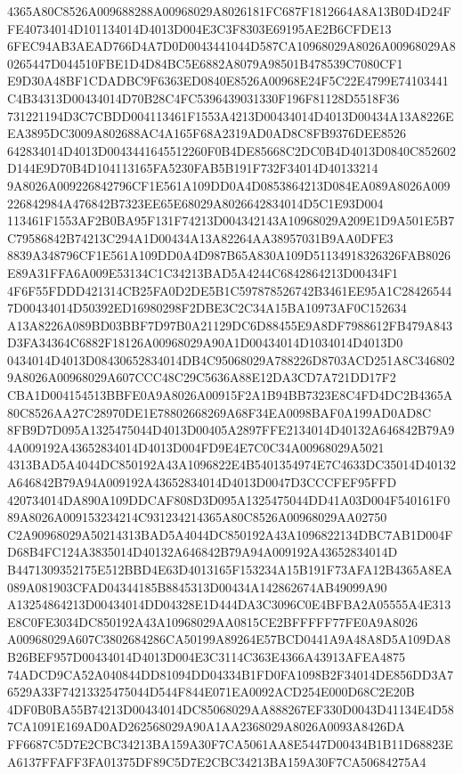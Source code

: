 \documentclass[UTF8,fontset=fandol,zihao=-4,a4paper]{ctexart}
\begin{document}
{{4365A80C8526A009688288A00968029A8026181FC687F1812664A8A13B0D4D24FFE40734014D101134014D4013D004E3C3F8303E69195AE2B6CFDE13
6FEC94AB3AEAD766D4A7D0D0043441044D587CA10968029A8026A00968029A80265447D044510FBE1D4D84BC5E6882A8079A98501B478539C7080CF1
E9D30A48BF1CDADBC9F6363ED0840E8526A00968E24F5C22E4799E74103441C4B34313D00434014D70B28C4FC5396439031330F196F81128D5518F36
731221194D3C7CBDD004113461F1553A4213D00434014D4013D00434A13A8226EEA3895DC3009A802688AC4A165F68A2319AD0AD8C8FB9376DEE8526
642834014D4013D0043441645512260F0B4DE85668C2DC0B4D4013D0840C852602D144E9D70B4D104113165FA5230FAB5B191F732F34014D40133214
9A8026A009226842796CF1E561A109DD0A4D0853864213D084EA089A8026A009226842984A476842B7323EE65E68029A8026642834014D5C1E93D004
113461F1553AF2B0BA95F131F74213D004342143A10968029A209E1D9A501E5B7C79586842B74213C294A1D00434A13A82264AA38957031B9AA0DFE3
8839A348796CF1E561A109DD0A4D987B65A830A109D51134918326326FAB8026E89A31FFA6A009E53134C1C34213BAD5A4244C6842864213D00434F1
4F6F55FDDD421314CB25FA0D2DE5B1C597878526742B3461EE95A1C284265447D00434014D50392ED16980298F2DBE3C2C34A15BA10973AF0C152634
A13A8226A089BD03BBF7D97B0A21129DC6D88455E9A8DF7988612FB479A843D3FA34364C6882F18126A00968029A90A1D00434014D1034014D4013D0
0434014D4013D08430652834014DB4C95068029A788226D8703ACD251A8C3468029A8026A00968029A607CCC48C29C5636A88E12DA3CD7A721DD17F2
CBA1D004154513BBFE0A9A8026A00915F2A1B94BB7323E8C4FD4DC2B4365A80C8526AA27C28970DE1E78802668269A68F34EA0098BAF0A199AD0AD8C
8FB9D7D095A1325475044D4013D00405A2897FFE2134014D40132A646842B79A94A009192A43652834014D4013D004FD9E4E7C0C34A00968029A5021
4313BAD5A4044DC850192A43A1096822E4B5401354974E7C4633DC35014D40132A646842B79A94A009192A43652834014D4013D0047D3CCCFEF95FFD
420734014DA890A109DDCAF808D3D095A1325475044DD41A03D004F540161F089A8026A009153234214C931234214365A80C8526A00968029AA02750
C2A90968029A50214313BAD5A4044DC850192A43A1096822134DBC7AB1D004FD68B4FC124A3835014D40132A646842B79A94A009192A43652834014D
B4471309352175E512BBD4E63D4013165F153234A15B191F73AFA12B4365A8EA089A081903CFAD04344185B8845313D00434A142862674AB49099A90
A13254864213D00434014DD04328E1D444DA3C3096C0E4BFBA2A05555A4E313E8C0FE3034DC850192A43A10968029AA0815CE2BFFFFF77FE0A9A8026
A00968029A607C3802684286CA50199A89264E57BCD0441A9A48A8D5A109DA8B26BEF957D00434014D4013D004E3C3114C363E4366A43913AFEA4875
74ADCD9CA52A040844DD81094DD04334B1FD0FA1098B2F34014DE856DD3A76529A33F74213325475044D544F844E071EA0092ACD254E000D68C2E20B
4DF0B0BA55B74213D00434014DC85068029AA888267EF330D0043D41134E4D587CA1091E169AD0AD262568029A90A1AA2368029A8026A0093A8426DA
FF6687C5D7E2CBC34213BA159A30F7CA5061AA8E5447D00434B1B11D68823EA6137FFAFF3FA01375DF89C5D7E2CBC34213BA159A30F7CA50684275A4
}}
\end{document}
